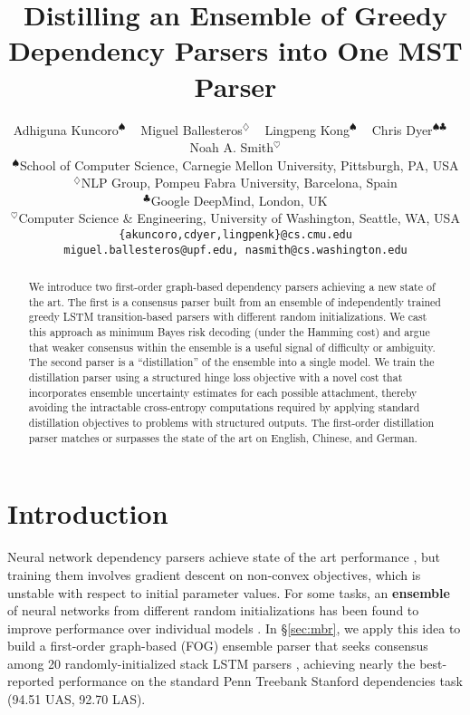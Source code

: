 \documentclass[11pt,letterpaper]{article}
\title{Distilling an Ensemble of Greedy Dependency Parsers into One MST Parser}
\author{Adhiguna Kuncoro$^{\spadesuit}$ ~ Miguel Ballesteros$^{\diamondsuit}$  ~ Lingpeng Kong$^{\spadesuit}$  ~ Chris Dyer$^{\spadesuit\clubsuit}$ ~ Noah A. Smith$^{\heartsuit}$ \\
$^{\spadesuit}$School of Computer Science, Carnegie Mellon University, Pittsburgh, PA, USA \\
$^{\diamondsuit}$NLP Group, Pompeu Fabra University, Barcelona, Spain \\
$^{\clubsuit}$Google DeepMind, London, UK\\
$^{\heartsuit}$Computer Science \& Engineering, University of Washington, Seattle, WA, USA\\
{\small \tt \{akuncoro,cdyer,lingpenk\}@cs.cmu.edu}\\ {\small \tt miguel.ballesteros@upf.edu, nasmith@cs.washington.edu}
}
\date{}
\newcommand{\ignore}[1]{}
\newcommand{\cjd}[1]{\textcolor{cyan}{\ignore{{\textbf{[#1 --\textsc{cjd}]}}}}}
\begin{document}
\maketitle

\begin{abstract}
We introduce two first-order graph-based dependency parsers achieving a new state of the art. The first is a consensus parser built from an ensemble of independently trained greedy LSTM transition-based parsers with different random initializations. We cast this approach as minimum Bayes risk decoding (under the Hamming cost) and argue that weaker consensus within the ensemble is a useful signal of difficulty or ambiguity. The second parser is a ``distillation'' of the ensemble into a single model. We train the distillation parser using a structured hinge loss objective with a novel cost that incorporates ensemble uncertainty estimates for each possible attachment, thereby avoiding the intractable cross-entropy computations required by applying standard distillation objectives to problems with structured outputs.\ignore{\cjd{Rather than giving the accuracies here, I think I'd prefer to say something about the distillation cost objective: maybe, it is ``the Hamming cost discounted by the posterior (or `ensemble'?) attachment uncertainty estimated from the ensemble of predictions.'' No one outside of parsing will remember or care about our numbers, people might care about this idea. I think including the parsing numbers makes us seem parochial, and this is a more interesting paper.}}
The first-order distillation parser matches or surpasses the state of the art on English, Chinese, and German. 
\end{abstract}
\section{Introduction}


Neural network dependency parsers achieve  state of the art performance
\cite{stack_lstm,structured_training,globally_normalized}, but training them
involves gradient descent on non-convex objectives, which is unstable with respect to initial parameter values.  For some tasks, an \textbf{ensemble} of neural networks from different random initializations has been found to improve performance over individual models \cite[\emph{inter alia}]{seq_to_seq,grammar_foreign}.  In \S\ref{sec:mbr}, we apply this idea to build a first-order graph-based (FOG) ensemble parser \cite{ensemble_reparsing} that seeks consensus among 20 randomly-initialized stack LSTM parsers \cite{stack_lstm}, achieving nearly the best-reported performance on the standard Penn Treebank Stanford dependencies task (94.51 UAS, 92.70 LAS).
\end{document}
